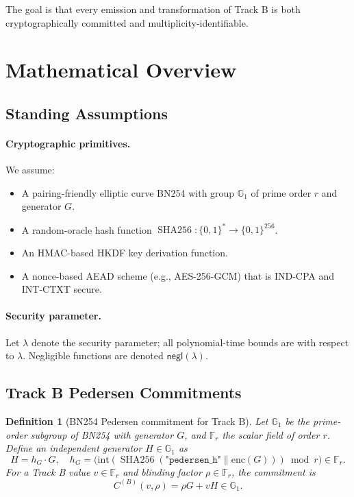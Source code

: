 \documentclass[11pt]{article}
\newtheorem{definition}{Definition}[section]
\newcommand{\F}{\mathbb{F}}
\newcommand{\G}{\mathbb{G}}
\DeclareMathOperator{\SHA}{SHA256}
\begin{document}
The goal is that every emission and transformation of Track B is both cryptographically committed and multiplicity-identifiable.

\section{Mathematical Overview}

\subsection{Standing Assumptions}

\paragraph{Cryptographic primitives.}
We assume:
\begin{itemize}[leftmargin=1.5em]
  \item A pairing-friendly elliptic curve BN254 with group \(\G_1\) of prime order \(r\) and generator \(G\).
  \item A random-oracle hash function \(\SHA: \{0,1\}^* \to \{0,1\}^{256}\).
  \item An HMAC-based HKDF key derivation function.
  \item A nonce-based AEAD scheme (e.g., AES-256-GCM) that is IND-CPA and INT-CTXT secure.
\end{itemize}

\paragraph{Security parameter.}
Let \(\lambda\) denote the security parameter; all polynomial-time bounds are with respect to \(\lambda\).
Negligible functions are denoted \(\mathsf{negl}(\lambda)\).

\subsection{Track B Pedersen Commitments}

\begin{definition}[BN254 Pedersen commitment for Track B]
Let \(\G_1\) be the prime-order subgroup of BN254 with generator \(G\), and \(\F_r\) the scalar field of order \(r\).
Define an independent generator \(H \in \G_1\) as
\[
  H = h_G \cdot G, \quad
  h_G = \bigl(\mathrm{int}(\SHA(\texttt{"pedersen\_h"} \| \mathrm{enc}(G))) \bmod r\bigr) \in \F_r.
\]
For a Track B value \(v \in \F_r\) and blinding factor \(\rho \in \F_r\), the commitment is
\[
  C^{(B)}(v, \rho) = \rho G + v H \in \G_1.
\]
\end{definition}
\end{document}

